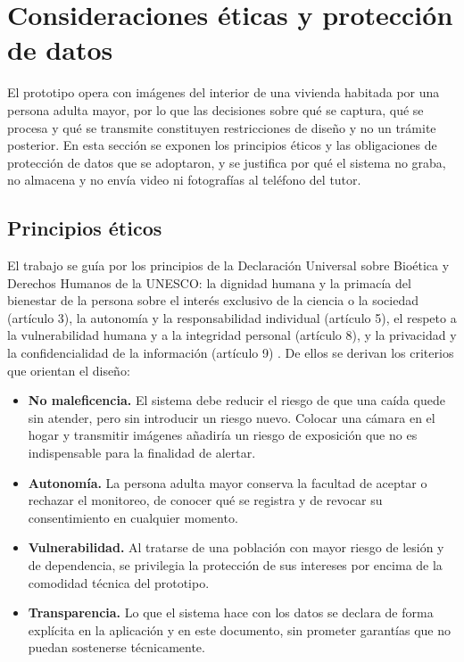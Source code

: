 \documentclass[12pt,a4paper,oneside]{book}
\theoremstyle{plain}
\theoremstyle{definition}
\theoremstyle{remark}
\begin{document}
\section{Consideraciones éticas y protección de datos}
\label{sec:etica}

El prototipo opera con imágenes del interior de una vivienda habitada por una persona adulta mayor, por lo que las decisiones sobre qué se captura, qué se procesa y qué se transmite constituyen restricciones de diseño y no un trámite posterior. En esta sección se exponen los principios éticos y las obligaciones de protección de datos que se adoptaron, y se justifica por qué el sistema no graba, no almacena y no envía video ni fotografías al teléfono del tutor.

\subsection{Principios éticos}

El trabajo se guía por los principios de la Declaración Universal sobre Bioética y Derechos Humanos de la UNESCO: la dignidad humana y la primacía del bienestar de la persona sobre el interés exclusivo de la ciencia o la sociedad (artículo 3), la autonomía y la responsabilidad individual (artículo 5), el respeto a la vulnerabilidad humana y a la integridad personal (artículo 8), y la privacidad y la confidencialidad de la información (artículo 9) \parencite{unesco2005bioetica}. De ellos se derivan los criterios que orientan el diseño:

\begin{itemize}
  \item \textbf{No maleficencia.} El sistema debe reducir el riesgo de que una caída quede sin atender, pero sin introducir un riesgo nuevo. Colocar una cámara en el hogar y transmitir imágenes añadiría un riesgo de exposición que no es indispensable para la finalidad de alertar.
  \item \textbf{Autonomía.} La persona adulta mayor conserva la facultad de aceptar o rechazar el monitoreo, de conocer qué se registra y de revocar su consentimiento en cualquier momento.
  \item \textbf{Vulnerabilidad.} Al tratarse de una población con mayor riesgo de lesión y de dependencia, se privilegia la protección de sus intereses por encima de la comodidad técnica del prototipo.
  \item \textbf{Transparencia.} Lo que el sistema hace con los datos se declara de forma explícita en la aplicación y en este documento, sin prometer garantías que no puedan sostenerse técnicamente.
\end{itemize}
\end{document}
